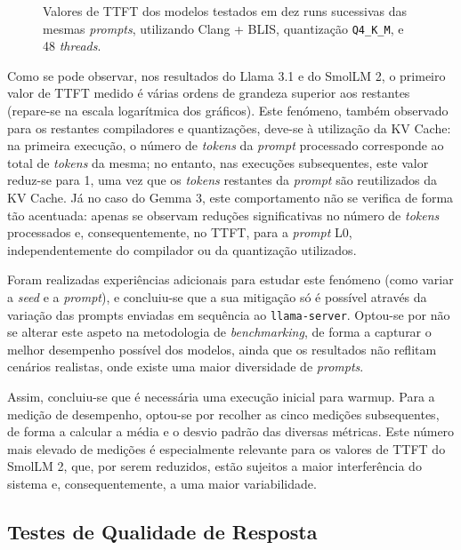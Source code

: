 \documentclass[11pt, a4paper]{article}
\begin{document}
\begin{figure}[H]
    \centering
    
    
    

    \caption{
        \onehalfspacing
        Valores de TTFT dos modelos testados em dez runs sucessivas das mesmas \emph{prompts},
        utilizando Clang + BLIS, quantização \texttt{Q4\_K\_M}, e 48 \emph{threads}.
    }
    \label{warmup-ttft}
\end{figure}

Como se pode observar, nos resultados do Llama 3.1 e do SmolLM 2, o primeiro valor de TTFT medido é
várias ordens de grandeza superior aos restantes (repare-se na escala logarítmica dos gráficos).
Este fenómeno, também observado para os restantes compiladores e quantizações, deve-se à utilização
da KV Cache: na primeira execução, o número de \emph{tokens} da \emph{prompt} processado corresponde
ao total de \emph{tokens} da mesma; no entanto, nas execuções subsequentes, este valor reduz-se para
1, uma vez que os \emph{tokens} restantes da \emph{prompt} são reutilizados da KV Cache. Já no caso
do Gemma 3, este comportamento não se verifica de forma tão acentuada: apenas se observam reduções
significativas no número de \emph{tokens} processados e, consequentemente, no TTFT, para a
\emph{prompt} L0, independentemente do compilador ou da quantização utilizados.

Foram realizadas experiências adicionais para estudar este fenómeno (como variar a \emph{seed} e a
\emph{prompt}), e concluiu-se que a sua mitigação só é possível através da variação das prompts
enviadas em sequência ao \texttt{llama-server}. Optou-se por não se alterar este aspeto na
metodologia de \emph{benchmarking}, de forma a capturar o melhor desempenho possível dos modelos,
ainda que os resultados não reflitam cenários realistas, onde existe uma maior diversidade de
\emph{prompts}.

Assim, concluiu-se que é necessária uma execução inicial para warmup. Para a medição de desempenho,
optou-se por recolher as cinco medições subsequentes, de forma a calcular a média e o desvio padrão
das diversas métricas. Este número mais elevado de medições é especialmente relevante para os
valores de TTFT do SmolLM 2, que, por serem reduzidos, estão sujeitos a maior interferência do
sistema e, consequentemente, a uma maior variabilidade.

\subsection{Testes de Qualidade de Resposta}
\label{quality-tests}
\end{document}
